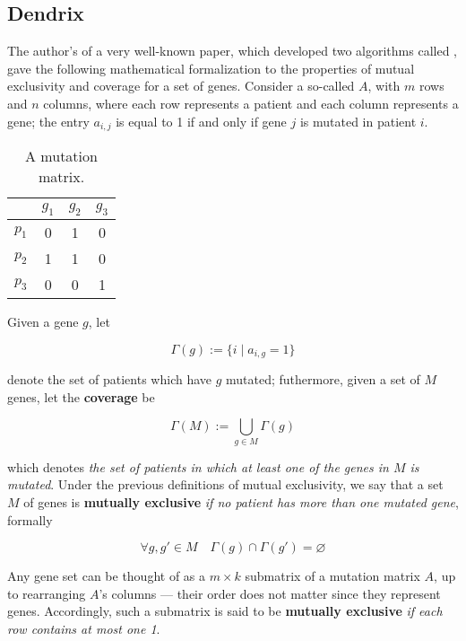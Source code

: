 \subsection{Dendrix}

The author's of a very well-known paper, which developed two algorithms called  \cite{dendrix}, gave the following mathematical formalization to the properties of mutual exclusivity and coverage for a set of genes. Consider a so-called  $A$, with $m$ rows and $n$ columns, where each row represents a patient and each column represents a gene; the entry $a_{i, j}$ is equal to 1 if and only if gene $j$ is mutated in patient $i$.

\begin{table}[H]
    \centering
    \begin{tabular}{c|ccc}
              & $g_1$ & $g_2$ & $g_3$ \\
        \hline
        $p_1$ & 0 & 1 & 0 \\
        \hline
        $p_2$ & 1 & 1 & 0 \\
        \hline
        $p_3$ & 0 & 0 & 1 \\
    \end{tabular}
    \caption{A mutation matrix.}\label{mutation_matrix}
\end{table}

Given a gene $g$, let

\begin{equation}
    \Gamma(g) := \{i \mid a_{i, g} = 1\}
\end{equation}

denote the set of patients which have $g$ mutated; futhermore, given a set of $M$ genes, let the \textbf{coverage} be

\begin{equation}
    \Gamma(M) := \bigcup_{g \in M}{\Gamma(g)}
\end{equation}

which denotes \textit{the set of patients in which at least one of the genes in $M$ is mutated}. Under the previous definitions of mutual exclusivity, we say that a set $M$ of genes is \textbf{mutually exclusive} \textit{if no patient has more than one mutated gene}, formally

\begin{equation}
    \forall g, g' \in M \quad \Gamma(g) \cap \Gamma(g') = \varnothing
\end{equation}

Any gene set can be thought of as a $m \times k$ submatrix of a mutation matrix $A$, up to rearranging $A$'s columns --- their order does not matter since they represent genes. Accordingly, such a submatrix is said to be \textbf{mutually exclusive} \textit{if each row contains at most one 1}.

